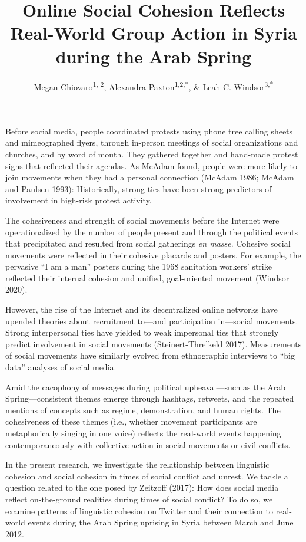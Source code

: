 \documentclass[
  english,
  man]{apa6}
\author{Megan Chiovaro\textsuperscript{1, 2}, Alexandra Paxton\textsuperscript{1,2,*}, \& Leah C. Windsor\textsuperscript{3,*}}
\affiliation{
\vspace{0.5cm}
\textsuperscript{1} Center for the Ecological Study of Perception and Action, University of Connecticut\\\textsuperscript{2} Department of Psychological Sciences, University of Connecticut\\\textsuperscript{3} University of Memphis\\\textsuperscript{*} Equal author contributions}
\title{Online Social Cohesion Reflects Real-World Group Action in Syria during the Arab Spring}
\date{}
\begin{document}
\maketitle

Before social media, people coordinated protests using phone tree calling sheets
and mimeographed flyers, through in-person meetings of social organizations and
churches, and by word of mouth. They gathered together and hand-made protest
signs that reflected their agendas. As McAdam found, people were more likely to
join movements when they had a personal connection (McAdam 1986; McAdam and Paulsen 1993): Historically, strong ties have been strong predictors of
involvement in high-risk protest activity.

The cohesiveness and strength of social movements before the Internet were
operationalized by the number of people present and through the political events
that precipitated and resulted from social gatherings \emph{en masse}. Cohesive
social movements were reflected in their cohesive placards and posters. For
example, the pervasive \enquote{I am a man} posters during the 1968 sanitation workers'
strike reflected their internal cohesion and unified, goal-oriented movement
(Windsor 2020).

However, the rise of the Internet and its decentralized online networks have
upended theories about recruitment to---and participation in---social movements.
Strong interpersonal ties have yielded to weak impersonal ties that strongly
predict involvement in social movements (Steinert-Threlkeld 2017). Measurements
of social movements have similarly evolved from ethnographic interviews to \enquote{big
data} analyses of social media.

Amid the cacophony of messages during political upheaval---such
as the Arab Spring---consistent themes emerge through hashtags, retweets, and
the repeated mentions of concepts such as regime, demonstration, and
human rights. The cohesiveness of these themes (i.e., whether movement
participants are metaphorically singing in one voice) reflects the real-world
events happening contemporaneously with collective action in social movements or
civil conflicts.

In the present research, we investigate the relationship between linguistic
cohesion and social cohesion in times of social conflict and unrest. We tackle a
question related to the one posed by Zeitzoff (2017): How does
social media reflect on-the-ground realities during times of social conflict? To
do so, we examine patterns of linguistic cohesion on Twitter and their
connection to real-world events during the Arab Spring uprising in Syria between
March and June 2012.
\end{document}
